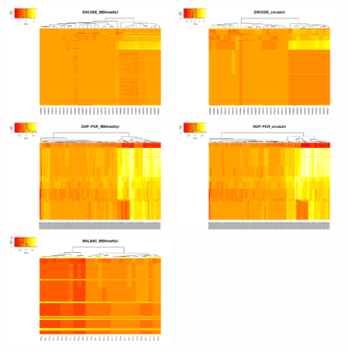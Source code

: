 \documentclass[11pt]{article}
\begin{document}
\begin{figure}[h]
\centering
\includegraphics[width=0.49\textwidth]{encode_MBAmethyl_theta_heat.pdf}
\includegraphics[width=0.49\textwidth]{encode_cnvJoint_theta_heat.pdf}\\
\includegraphics[width=0.49\textwidth]{poly_MBAmethyl_theta_heat.pdf}
\includegraphics[width=0.49\textwidth]{poly_cnvJoint_theta_heat.pdf}\\
\includegraphics[width=0.49\textwidth]{lung_MBAmethyl_theta_heat.pdf}

\end{figure}
\end{document}
